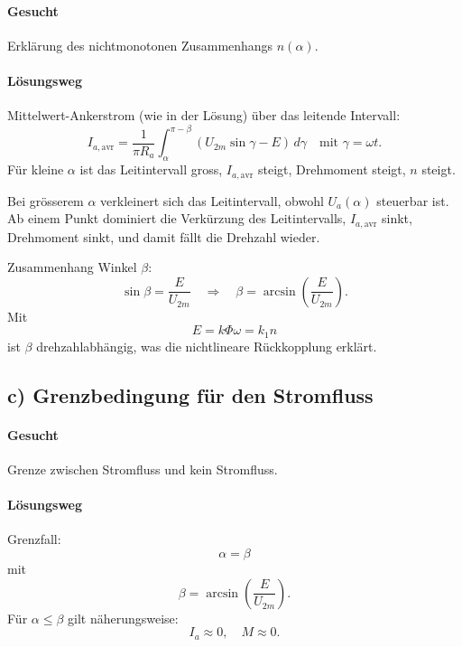 \paragraph{Gesucht}
Erklärung des nichtmonotonen Zusammenhangs $n(\alpha)$.

\paragraph{Lösungsweg}
Mittelwert-Ankerstrom (wie in der Lösung) über das leitende Intervall:
\[
\boxed{
I_{a,\mathrm{avr}}
=
\frac{1}{\pi R_a}\int_{\alpha}^{\pi-\beta}\left(U_{2m}\sin\gamma - E\right)\,d\gamma
}
\quad \text{mit } \gamma=\omega t.
\]
Für kleine $\alpha$ ist das Leitintervall gross, $I_{a,\mathrm{avr}}$ steigt, Drehmoment steigt, $n$ steigt.

Bei grösserem $\alpha$ verkleinert sich das Leitintervall, obwohl $U_a(\alpha)$ steuerbar ist.
Ab einem Punkt dominiert die Verkürzung des Leitintervalls, $I_{a,\mathrm{avr}}$ sinkt, Drehmoment sinkt,
und damit fällt die Drehzahl wieder.

Zusammenhang Winkel $\beta$:
\[
\sin\beta=\frac{E}{U_{2m}}
\quad\Rightarrow\quad
\boxed{\beta=\arcsin\!\left(\frac{E}{U_{2m}}\right)}.
\]
Mit
\[
E=k\Phi\omega=k_1 n
\]
ist $\beta$ drehzahlabhängig, was die nichtlineare Rückkopplung erklärt.


\subsection*{c) Grenzbedingung für den Stromfluss}

\paragraph{Gesucht}
Grenze zwischen Stromfluss und kein Stromfluss.

\paragraph{Lösungsweg}
Grenzfall:
\[
\boxed{\alpha=\beta}
\]
mit
\[
\boxed{\beta=\arcsin\!\left(\frac{E}{U_{2m}}\right)}.
\]
Für $\alpha\le\beta$ gilt näherungsweise:
\[
I_a \approx 0,\quad M\approx 0.
\]


